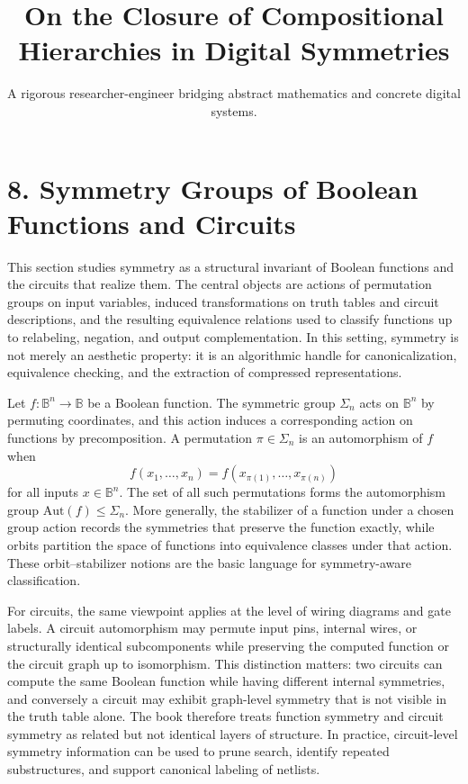 \documentclass[11pt]{article}
\title{On the Closure of Compositional Hierarchies in Digital Symmetries}
\author{A rigorous researcher-engineer bridging abstract mathematics and concrete digital systems.}
\begin{document}
\section*{8. Symmetry Groups of Boolean Functions and Circuits}

This section studies symmetry as a structural invariant of Boolean functions and the circuits that realize them. The central objects are actions of permutation groups on input variables, induced transformations on truth tables and circuit descriptions, and the resulting equivalence relations used to classify functions up to relabeling, negation, and output complementation. In this setting, symmetry is not merely an aesthetic property: it is an algorithmic handle for canonicalization, equivalence checking, and the extraction of compressed representations.

Let $f : \mathbb{B}^n \to \mathbb{B}$ be a Boolean function. The symmetric group $\Sigma_n$ acts on $\mathbb{B}^n$ by permuting coordinates, and this action induces a corresponding action on functions by precomposition. A permutation $\pi \in \Sigma_n$ is an automorphism of $f$ when
\[
  f(x_1,\dots,x_n) = f(x_{\pi(1)},\dots,x_{\pi(n)})
\]
for all inputs $x \in \mathbb{B}^n$. The set of all such permutations forms the automorphism group $\mathrm{Aut}(f) \leq \Sigma_n$. More generally, the stabilizer of a function under a chosen group action records the symmetries that preserve the function exactly, while orbits partition the space of functions into equivalence classes under that action. These orbit--stabilizer notions are the basic language for symmetry-aware classification.

For circuits, the same viewpoint applies at the level of wiring diagrams and gate labels. A circuit automorphism may permute input pins, internal wires, or structurally identical subcomponents while preserving the computed function or the circuit graph up to isomorphism. This distinction matters: two circuits can compute the same Boolean function while having different internal symmetries, and conversely a circuit may exhibit graph-level symmetry that is not visible in the truth table alone. The book therefore treats function symmetry and circuit symmetry as related but not identical layers of structure. In practice, circuit-level symmetry information can be used to prune search, identify repeated substructures, and support canonical labeling of netlists.
\end{document}

